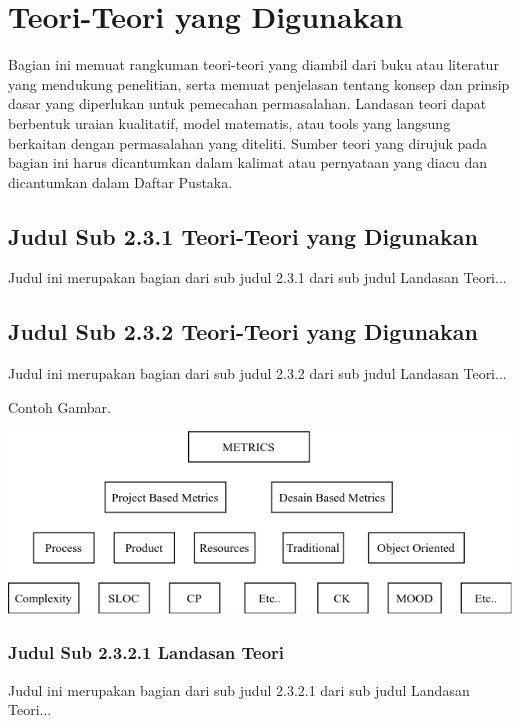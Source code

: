 \documentclass[oneside,listof=totoc]{scrbook}
\begin{document}
\clearpage
\section{Teori-Teori yang Digunakan}
Bagian ini memuat rangkuman teori-teori yang diambil dari buku atau literatur yang mendukung penelitian, serta memuat penjelasan tentang konsep dan prinsip dasar yang diperlukan untuk pemecahan permasalahan. Landasan teori dapat berbentuk uraian kualitatif, model matematis, atau tools yang langsung berkaitan dengan permasalahan yang diteliti. Sumber teori yang dirujuk pada bagian ini harus dicantumkan dalam kalimat atau pernyataan yang diacu dan dicantumkan dalam Daftar Pustaka.

\subsection{Judul Sub 2.3.1 Teori-Teori yang Digunakan}
Judul ini merupakan bagian dari sub judul 2.3.1 dari sub judul Landasan Teori...

\subsection{Judul Sub 2.3.2 Teori-Teori yang Digunakan}
Judul ini merupakan bagian dari sub judul 2.3.2 dari sub judul Landasan Teori...

\noindent Contoh Gambar.

\vspace{0.5cm}

\begin{center}
  \begin{minipage}{\textwidth}
    \label{gambar:2.1}
    \includegraphics[width=13.5cm]{gambar/gambar_2.1.png}
    \vspace{0.5cm}
  \end{minipage}
\end{center}

\clearpage
\subsubsection{Judul Sub 2.3.2.1 Landasan Teori}
Judul ini merupakan bagian dari sub judul 2.3.2.1 dari sub judul Landasan Teori...
\end{document}
